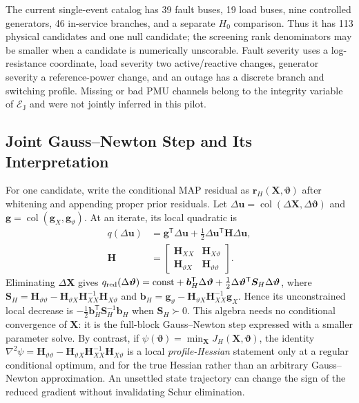 The current single-event catalog has 39 fault buses, 19 load buses, nine controlled generators, 46 in-service branches, and a separate $H_0$ comparison. Thus it has 113 physical candidates and one null candidate; the screening rank denominators may be smaller when a candidate is numerically unscorable. Fault severity uses a log-resistance coordinate, load severity two active/reactive changes, generator severity a reference-power change, and an outage has a discrete branch and switching profile. Missing or bad PMU channels belong to the integrity variable of $\mathcal E_{\mathrm J}$ and were not jointly inferred in this pilot.

\subsection{Joint Gauss--Newton Step and Its Interpretation}

For one candidate, write the conditional MAP residual as $\bm r_H(\bm X,\bm\vartheta)$ after whitening and appending proper prior residuals. Let $\Delta\bm u=\operatorname{col}(\Delta\bm X,\Delta\bm\vartheta)$ and $\bm g=\operatorname{col}(\bm g_X,\bm g_{\vartheta})$. At an iterate, its local quadratic is
\begin{equation}
\begin{aligned}
q(\Delta\bm u)&=\bm g^{\mathsf T}\Delta\bm u+
\tfrac12\Delta\bm u^{\mathsf T}\bm H\Delta\bm u,\\
\bm H&=\begin{bmatrix}
\bm H_{XX}&\bm H_{X\vartheta}\\
\bm H_{\vartheta X}&\bm H_{\vartheta\vartheta}
\end{bmatrix}.
\end{aligned}
\label{eq:pilot-block-quadratic}
\end{equation}
Eliminating $\Delta\bm X$ gives $q_{\rm red}(\Delta\bm\vartheta)=\mathrm{const}+\bm b_H^{\mathsf T}\Delta\bm\vartheta+\tfrac12\Delta\bm\vartheta^{\mathsf T}\bm S_H\Delta\bm\vartheta$, where $\bm S_H=\bm H_{\vartheta\vartheta}-\bm H_{\vartheta X}\bm H_{XX}^{-1}\bm H_{X\vartheta}$ and $\bm b_H=\bm g_{\vartheta}-\bm H_{\vartheta X}\bm H_{XX}^{-1}\bm g_X$. Hence its unconstrained local decrease is $-\tfrac12\bm b_H^{\mathsf T}\bm S_H^{-1}\bm b_H$ when $\bm S_H\succ0$. This algebra needs no conditional convergence of $\bm X$: it is the full-block Gauss--Newton step expressed with a smaller parameter solve. By contrast, if $\psi(\bm\vartheta)=\min_{\bm X}J_H(\bm X,\bm\vartheta)$, the identity $\nabla^2\psi=\bm H_{\vartheta\vartheta}-\bm H_{\vartheta X}\bm H_{XX}^{-1}\bm H_{X\vartheta}$ is a local \emph{profile-Hessian} statement only at a regular conditional optimum, and for the true Hessian rather than an arbitrary Gauss--Newton approximation. An unsettled state trajectory can change the sign of the reduced gradient without invalidating Schur elimination.

